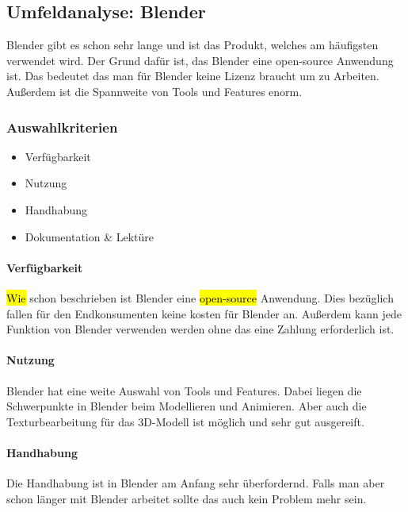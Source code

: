 \pagebreak

\subsection{Umfeldanalyse: Blender}
Blender gibt es schon sehr lange und ist das Produkt, welches am häufigsten verwendet wird. Der Grund dafür ist, das Blender eine open-source Anwendung ist. Das bedeutet das man für Blender keine Lizenz braucht um zu Arbeiten. Außerdem ist die Spannweite von Tools und Features enorm.

\subsubsection{Auswahlkriterien}
\begin{itemize}
    \item Verfügbarkeit
    \item Nutzung
    \item Handhabung
    \item Dokumentation \& Lektüre
\end{itemize}


\paragraph{Verfügbarkeit}
\hl{Wie} schon beschrieben ist Blender eine \hl{open-source} Anwendung. Dies bezüglich fallen für den Endkonsumenten keine kosten für Blender an. Außerdem kann jede Funktion von Blender verwenden werden ohne das eine Zahlung erforderlich ist.


\paragraph{Nutzung}
Blender hat eine weite Auswahl von Tools und Features. Dabei liegen die Schwerpunkte in Blender beim Modellieren und Animieren. Aber auch die Texturbearbeitung für das 3D-Modell ist möglich und sehr gut ausgereift.

\paragraph{Handhabung}
Die Handhabung ist in Blender am Anfang sehr überfordernd. Falls man aber schon länger mit Blender arbeitet sollte das auch kein Problem mehr sein.

